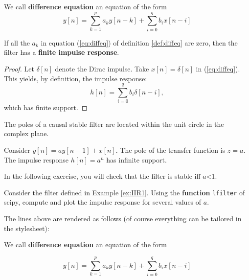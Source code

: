     \begin{listing}
\begin{definition}
\label{def:diffeq} We call \textbf{difference equation} an equation of
the form \begin{equation}
\label{eq:diffeq}
y[n]= \sum_{k=1}^{p} a_k y[n-k] + \sum_{i=0}^q b_i x[n-i]
\end{equation}
\end{definition}

\begin{property}
If all the $a_k$ in equation (\ref{eq:diffeq}) of definition
\ref{def:diffeq} are zero, then the filter has a \textbf{finite impulse
response}.
\end{property}

\begin{proof}
Let $\delta[n]$ denote the Dirac impulse. Take $x[n]=\delta[n]$ in
(\ref{eq:diffeq}). This yields, by definition, the impulse response: \begin{equation}
\label{eq:fir}
h[n]= \sum_{i=0}^q b_i \delta[n-i],
\end{equation} which has finite support.
\end{proof}

\begin{theorem}
The poles of a causal stable filter are located within the unit circle
in the complex plane.
\end{theorem}

\begin{example}
\label{ex:IIR1} Consider $y[n]= a y[n-1] +  x[n]$. The pole of the
transfer function is $z=a$. The impulse response $h[n]=a^n$ has infinite
support.
\end{example}

In the following exercise, you will check that the filter is stable iff $a$<1.

\begin{exercise}
\label{ex:exofilter} Consider the filter defined in Example
\ref{ex:IIR1}. Using the \textbf{function} \texttt{lfilter} of scipy,
compute and plot the impulse response for several values of $a$.
\end{exercise}

\end{listing}

    The lines above are rendered as follows (of course everything can be
tailored in the stylesheet):

\begin{definition}
\label{def:diffeq} We call \textbf{difference equation} an equation of
the form

\begin{equation}
\label{eq:diffeq}
y[n]= \sum_{k=1}^{p} a_k y[n-k] + \sum_{i=0}^q b_i x[n-i]
\end{equation}
\end{definition}


